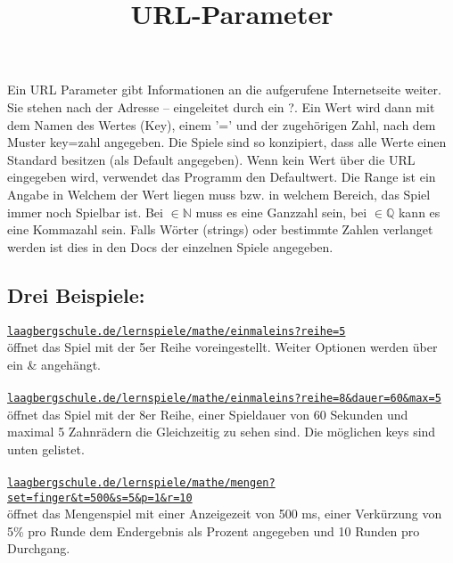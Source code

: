 \documentclass[a4paper]{article}
\title{URL-Parameter}
\begin{document}
\maketitle

\begin{multicols}{2}
Ein URL Parameter gibt Informationen an die aufgerufene Internetseite weiter. Sie stehen nach der Adresse -- eingeleitet durch ein ?.
Ein Wert wird dann mit dem Namen des Wertes (Key), einem '=' und der zugehörigen Zahl, nach dem Muster key=zahl angegeben. Die Spiele sind so konzipiert, dass alle Werte einen Standard besitzen (als Default angegeben). Wenn kein Wert über die URL eingegeben wird, verwendet das Programm den Defaultwert.
Die Range ist ein Angabe in Welchem der Wert liegen muss bzw. in welchem Bereich, das Spiel immer noch Spielbar ist. Bei $\in \mathbb{N} $ muss es eine Ganzzahl sein, bei $\in \mathbb{Q} $ kann es eine Kommazahl sein. Falls Wörter (strings) oder bestimmte Zahlen verlanget werden ist dies in den Docs der einzelnen Spiele angegeben.
\end{multicols}

\subsection*{Drei Beispiele:}
\texttt{\href{laagbergschule.de/lernspiele/mathe/einmaleins?reihe=5}{laagbergschule.de/lernspiele/mathe/einmaleins?reihe=5}} \\
öffnet das Spiel mit der 5er Reihe voreingestellt.
Weiter Optionen werden über ein \& angehängt. \\\\

\texttt{\href{laagbergschule.de/lernspiele/mathe/einmaleins?reihe=8\&dauer=60\&max=5}{laagbergschule.de/lernspiele/mathe/einmaleins?reihe=8\&dauer=60\&max=5}} \\
öffnet das Spiel mit der 8er Reihe, einer Spieldauer von 60 Sekunden und maximal 5 Zahnrädern die Gleichzeitig zu sehen sind. Die möglichen keys sind unten gelistet. \\\\

\texttt{\href{laagbergschule.de/lernspiele/mathe/mengen?set=finger\&t=500\&s=5\&p=1\&r=10}{laagbergschule.de/lernspiele/mathe/mengen?set=finger\&t=500\&s=5\&p=1\&r=10}} \\
öffnet das Mengenspiel mit einer Anzeigezeit von 500 ms, einer Verkürzung von 5\% pro Runde dem Endergebnis als Prozent angegeben und 10 Runden pro Durchgang.
\end{document}
